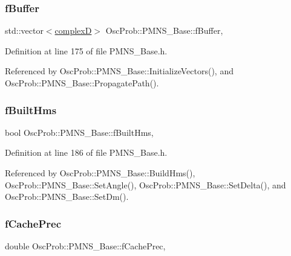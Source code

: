 \subsubsection{\texorpdfstring{f\+Buffer}{fBuffer}}
{\footnotesize\ttfamily std\+::vector$<$\hyperlink{EigenPoint_8h_a67ca8e107e20610c3fff78d5e726ece0}{complexD}$>$ Osc\+Prob\+::\+P\+M\+N\+S\+\_\+\+Base\+::f\+Buffer\hspace{0.3cm}{\ttfamily [protected]}, {\ttfamily [inherited]}}



Definition at line 175 of file P\+M\+N\+S\+\_\+\+Base.\+h.



Referenced by Osc\+Prob\+::\+P\+M\+N\+S\+\_\+\+Base\+::\+Initialize\+Vectors(), and Osc\+Prob\+::\+P\+M\+N\+S\+\_\+\+Base\+::\+Propagate\+Path().

\mbox{\label{classOscProb_1_1PMNS__Base_a9ac3cadeac8db1b90f3152f476244780}} 
\subsubsection{\texorpdfstring{f\+Built\+Hms}{fBuiltHms}}
{\footnotesize\ttfamily bool Osc\+Prob\+::\+P\+M\+N\+S\+\_\+\+Base\+::f\+Built\+Hms\hspace{0.3cm}{\ttfamily [protected]}, {\ttfamily [inherited]}}



Definition at line 186 of file P\+M\+N\+S\+\_\+\+Base.\+h.



Referenced by Osc\+Prob\+::\+P\+M\+N\+S\+\_\+\+Base\+::\+Build\+Hms(), Osc\+Prob\+::\+P\+M\+N\+S\+\_\+\+Base\+::\+Set\+Angle(), Osc\+Prob\+::\+P\+M\+N\+S\+\_\+\+Base\+::\+Set\+Delta(), and Osc\+Prob\+::\+P\+M\+N\+S\+\_\+\+Base\+::\+Set\+Dm().

\mbox{\label{classOscProb_1_1PMNS__Base_a0b4c41a27de281472453a1912cbc1e64}} 
\subsubsection{\texorpdfstring{f\+Cache\+Prec}{fCachePrec}}
{\footnotesize\ttfamily double Osc\+Prob\+::\+P\+M\+N\+S\+\_\+\+Base\+::f\+Cache\+Prec\hspace{0.3cm}{\ttfamily [protected]}, {\ttfamily [inherited]}}



